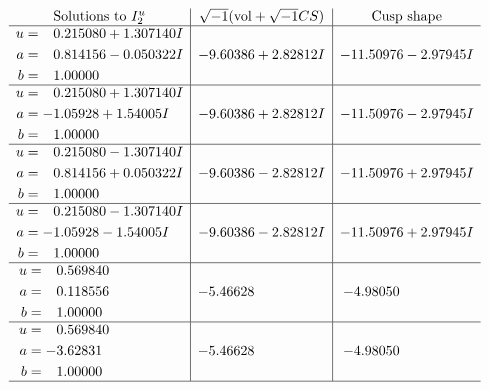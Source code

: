 \documentclass[1p]{elsarticle_modified}
\theoremstyle{definition}
\newcommand{\I}{\sqrt{-1}}
\begin{document}
$$\begin{array}{c|c|c}  
\text{Solutions to }I^u_{2}& \I (\text{vol} + \sqrt{-1}CS) & \text{Cusp shape}\\
 \hline 
\begin{aligned}
u &= \phantom{-}0.215080 + 1.307140 I \\
a &= \phantom{-}0.814156 - 0.050322 I \\
b &= \phantom{-}1.00000\phantom{ +0.000000I}\end{aligned}
 & -9.60386 + 2.82812 I & -11.50976 - 2.97945 I \\ \hline\begin{aligned}
u &= \phantom{-}0.215080 + 1.307140 I \\
a &= -1.05928 + 1.54005 I \\
b &= \phantom{-}1.00000\phantom{ +0.000000I}\end{aligned}
 & -9.60386 + 2.82812 I & -11.50976 - 2.97945 I \\ \hline\begin{aligned}
u &= \phantom{-}0.215080 - 1.307140 I \\
a &= \phantom{-}0.814156 + 0.050322 I \\
b &= \phantom{-}1.00000\phantom{ +0.000000I}\end{aligned}
 & -9.60386 - 2.82812 I & -11.50976 + 2.97945 I \\ \hline\begin{aligned}
u &= \phantom{-}0.215080 - 1.307140 I \\
a &= -1.05928 - 1.54005 I \\
b &= \phantom{-}1.00000\phantom{ +0.000000I}\end{aligned}
 & -9.60386 - 2.82812 I & -11.50976 + 2.97945 I \\ \hline\begin{aligned}
u &= \phantom{-}0.569840\phantom{ +0.000000I} \\
a &= \phantom{-}0.118556\phantom{ +0.000000I} \\
b &= \phantom{-}1.00000\phantom{ +0.000000I}\end{aligned}
 & -5.46628\phantom{ +0.000000I} & -4.98050\phantom{ +0.000000I} \\ \hline\begin{aligned}
u &= \phantom{-}0.569840\phantom{ +0.000000I} \\
a &= -3.62831\phantom{ +0.000000I} \\
b &= \phantom{-}1.00000\phantom{ +0.000000I}\end{aligned}
 & -5.46628\phantom{ +0.000000I} & -4.98050\phantom{ +0.000000I}\\
 \hline 
 \end{array}$$\newpage\newpage\renewcommand{\arraystretch}{1}
\end{document}

